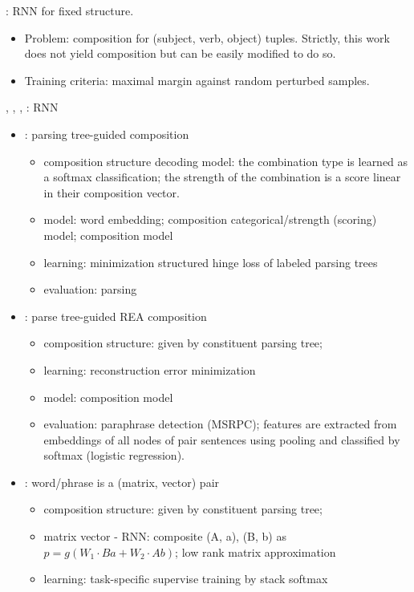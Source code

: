 \documentclass{article} %
\begin{document}
\cite{bordes2012joint}: RNN for fixed structure.
\begin{itemize}
\item Problem: composition for (subject, verb, object) tuples. Strictly,
	this work does not yield composition but can be easily modified to do so.
\item Training criteria: maximal margin against random perturbed samples.
\end{itemize}


\cite{socher2010learning}, \cite{socher2011dynamic}, \cite{socher2012semantic},
\cite{socher2013parsing}: RNN
\begin{itemize}
\item \cite{socher2010learning}: parsing tree-guided composition
	\begin{itemize}
	\item composition structure decoding model: the combination type is learned
		as a softmax classification; the strength of the combination is a score
		linear in their composition vector.
	\item model: word embedding; composition categorical/strength (scoring)
		model; composition model
	\item learning: minimization structured hinge loss of labeled parsing trees
	\item evaluation: parsing
	\end{itemize}
\item \cite{socher2011dynamic}: parse tree-guided REA composition
	\begin{itemize}
	\item composition structure: given by constituent parsing tree;
	\item learning: reconstruction error minimization
	\item model: composition model
	\item evaluation: paraphrase detection (MSRPC); features are extracted
		from embeddings of all nodes of pair sentences using pooling and
		classified by softmax (logistic regression).
	\end{itemize}
\item \cite{socher2012semantic}: word/phrase is a (matrix, vector) pair
	\begin{itemize}
	\item composition structure: given by constituent parsing tree;
	\item matrix vector - RNN:  composite (A, a), (B, b) as
		$p = g(W_1 \cdot Ba + W_2 \cdot Ab)$; low rank matrix approximation
	\item learning: task-specific supervise training by stack softmax

\end{itemize}
\end{itemize}
\end{document}
